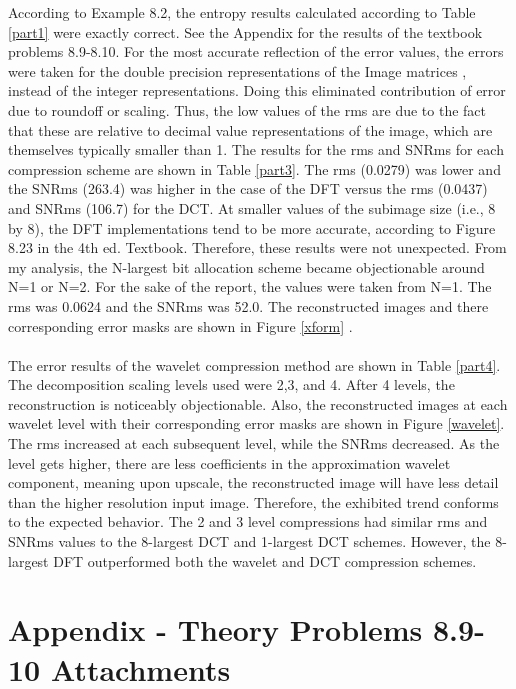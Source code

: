 \documentclass[./rarnold_project6.tex]{subfiles}
\begin{document}
\noindent According to Example 8.2, the entropy results calculated according to Table \ref{part1} were exactly correct.  See the Appendix for the results of the textbook problems 8.9-8.10.  For the most accurate reflection of the error values, the errors were taken for the double precision representations of the Image matrices , instead of the integer representations.  Doing this eliminated contribution of error due to roundoff or scaling.  Thus, the low values of the rms are due to the fact that these are relative to decimal value representations of the image, which are themselves typically smaller than 1.  The results for the rms and SNRms for each compression scheme are shown in Table \ref{part3}.  The rms (0.0279) was lower and the SNRms (263.4) was higher in the case of the DFT versus the rms (0.0437) and SNRms (106.7) for the DCT.  At smaller values of the subimage size (i.e., 8 by 8), the DFT implementations tend to be more accurate, according to Figure 8.23 in the 4th ed. Textbook.  Therefore, these results were not unexpected.  From my analysis, the N-largest bit allocation scheme became objectionable around N=1 or N=2.  For the sake of the report, the values were taken from N=1.  The rms was 0.0624 and the SNRms was 52.0.  The reconstructed images and there corresponding error masks are shown in Figure \ref{xform} .
\\ \\
\noindent The error results of the wavelet compression method are shown in Table \ref{part4}.  The decomposition scaling levels used were 2,3, and 4.  After 4 levels, the reconstruction is noticeably objectionable.  Also, the reconstructed images at each wavelet level with their corresponding error masks are shown in Figure \ref{wavelet}.   The rms increased at each subsequent level, while the SNRms decreased.  As the level gets higher, there are less coefficients in the approximation wavelet component, meaning upon upscale, the reconstructed image will have less detail than the higher resolution input image.  Therefore, the exhibited trend conforms to the expected behavior.  The 2 and 3 level compressions had similar rms and SNRms values to the 8-largest DCT  and 1-largest DCT schemes.  However, the 8-largest DFT outperformed both the wavelet and DCT compression schemes.  

\clearpage
\section*{Appendix - Theory Problems 8.9-10 Attachments}
%

\end{document}
